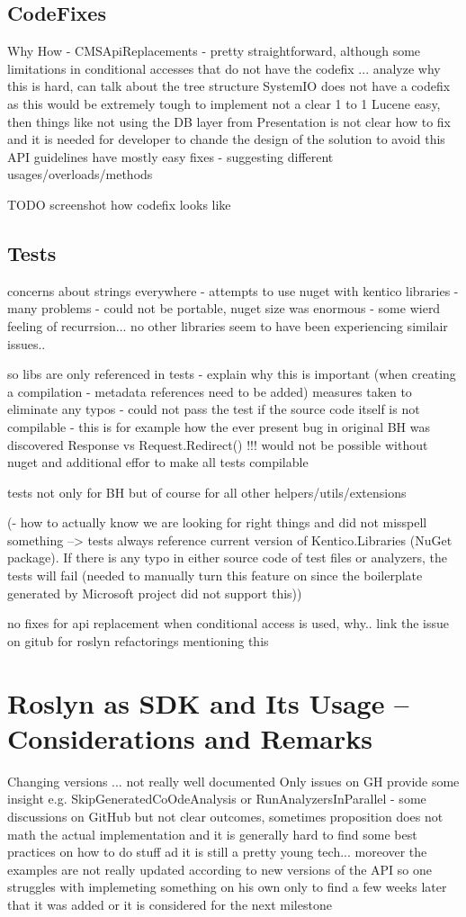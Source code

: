 \documentclass[
  digital, %
  table,   %
  lof,     %
  lot,     %
  oneside,
]{fithesis3}
\begin{document}
\subsection{CodeFixes}
Why
How - CMSApiReplacements - pretty straightforward, although some limitations in conditional accesses that do not have the codefix ... analyze why this is hard, can talk about the tree structure
SystemIO does not have a codefix as this would be extremely tough to implement not a clear 1 to 1
Lucene easy, then things like not using the DB layer from Presentation is not clear how to fix and it is needed for developer to chande the design of the solution to avoid this
API guidelines have mostly easy fixes - suggesting different usages/overloads/methods

TODO screenshot how codefix looks like

\subsection{Tests}
concerns about strings everywhere - attempts to use nuget with kentico libraries - many problems - could not be portable, nuget size was enormous - some wierd feeling of recurrsion... no other libraries seem to have been experiencing similair issues..

so libs are only referenced in tests - explain why this is important (when creating a compilation - metadata references need to be added)
measures taken to eliminate any typos - could not pass the test if the source code itself is not compilable - this is for example how the ever present bug in original BH was discovered Response vs Request.Redirect() !!! would not be possible without nuget and additional effor to make all tests compilable

tests not only for BH but of course for all other helpers/utils/extensions

(- how to actually know we are looking for right things and did not misspell something --> tests always reference current version of Kentico.Libraries (NuGet package). If there is any typo in either source code of test files or analyzers, the tests will fail (needed to manually turn this feature on since the boilerplate generated by Microsoft project did not support this))

no fixes for api replacement when conditional access is used, why.. link the issue on gitub for roslyn refactorings mentioning this

\section{Roslyn as SDK and Its Usage -- Considerations and Remarks}
Changing versions ... not really well documented
Only issues on GH provide some insight
e.g. SkipGeneratedCoOdeAnalysis or RunAnalyzersInParallel - some discussions on GitHub but not clear outcomes, sometimes proposition does not math the actual implementation and it is generally hard to find some best practices on how to do stuff ad it is still a pretty young tech... moreover the examples are not really updated according to new versions of the API so one struggles with implemeting something on his own only to find a few weeks later that it was added or it is considered for the next milestone
\end{document}

